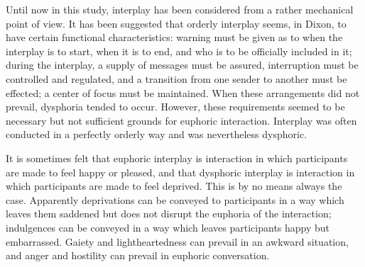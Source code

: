 \documentclass[openany,nobib]{tufte-book}
\begin{document}
Until now in this study, interplay has been considered from a rather
mechanical point of view. It has been suggested that orderly interplay
seems, in Dixon, to have certain functional characteristics: warning
must be given as to when the interplay is to start, when it is to end,
and who is to be officially included in it; during the interplay, a
supply of messages must be assured, interruption must be controlled and
regulated, and a transition from one sender to another must be effected;
a center of focus must be maintained. When these arrangements did not
prevail, dysphoria tended to occur. However, these requirements seemed
to be necessary but not sufficient grounds for euphoric interaction.
Interplay was often conducted in a perfectly orderly way and was
nevertheless dysphoric.

It is sometimes felt that euphoric interplay is interaction in which
participants are made to feel happy or pleased, and that dysphoric
interplay is interaction in which participants are made to feel
deprived. This is by no means always the case. Apparently deprivations
can be conveyed to participants in a way which leaves them saddened but
does not disrupt the euphoria of the interaction; indulgences can be
conveyed in a way which leaves participants happy but embarrassed.
Gaiety and lightheartedness can prevail in an awkward situation, and
anger and hostility can prevail in euphoric conversation.
\end{document}
